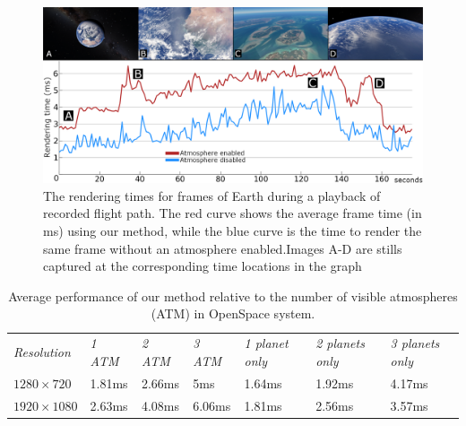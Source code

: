 \documentclass[journal]{vgtc}                %
\newcommand{\review}[1]{{\color{blue}#1}}
\begin{document}
\begin{figure}[b]
 \centering
 \includegraphics[width=\columnwidth]{figures/performance_image.png}
 \vspace*{-7mm}
 \caption{The rendering times for frames of Earth during a playback of recorded flight path. The red curve shows the average frame time (in ms) using our method, while the blue curve is the time to render the same frame without an atmosphere enabled.Images A-D are stills captured at the corresponding time locations in the graph}
 \label{fig:Performance}
 \vspace*{-2mm}
\end{figure}
\begingroup
\setlength{\tabcolsep}{0.2em}
\begin{table}[t]
\review{
  \centering
  \begin{tabular}{|p{1.4cm}|p{0.8cm} p{0.8cm} p{0.8cm} p{1.4cm} p{1.4cm} p{1.4cm}|}
    \hline
    \small{\textit{Resolution}} & \small{\textit{1 ATM}} & \small{\textit{2 ATM}} & \small{\textit{3 ATM}} & \small{\textit{1 planet only}}  & \small{\textit{2 planets only}}  & \small{\textit{3 planets only}}\\
    {\small $1280\times720$} & {\small 1.81ms} & {\small 2.66ms} & {\small 5ms} & {\small 1.64ms} & {\small 1.92ms} & {\small 4.17ms}\\
    {\small $1920\times1080$} & {\small 2.63ms} & {\small 4.08ms} & {\small 6.06ms} & {\small 1.81ms} & {\small 2.56ms} & {\small 3.57ms}\\
    \hline
  \end{tabular}
  \vspace*{0.1cm}
  \caption{Average performance of our method relative to the number of visible atmospheres (ATM) in OpenSpace system.}
  \label{tab:performance}
} %
\vspace*{-7mm}
\end{table}
\endgroup
\end{document}

